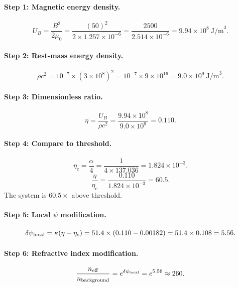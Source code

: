 \documentclass[12pt,a4paper]{article}
\theoremstyle{remark}
\begin{document}
\paragraph{Step 1: Magnetic energy density.}
\begin{equation}
U_B = \frac{B^2}{2\mu_0} = \frac{(50)^2}{2 \times 1.257 \times 10^{-6}}
= \frac{2500}{2.514 \times 10^{-6}} = 9.94 \times 10^{8}~\text{J/m}^3.
\end{equation}

\paragraph{Step 2: Rest-mass energy density.}
\begin{equation}
\rho c^2 = 10^{-7} \times (3 \times 10^8)^2 = 10^{-7} \times 9 \times 10^{16}
= 9.0 \times 10^{9}~\text{J/m}^3.
\end{equation}

\paragraph{Step 3: Dimensionless ratio.}
\begin{equation}
\eta = \frac{U_B}{\rho c^2} = \frac{9.94 \times 10^8}{9.0 \times 10^9} = 0.110.
\end{equation}

\paragraph{Step 4: Compare to threshold.}
\begin{equation}
\eta_c = \frac{\alpha}{4} = \frac{1}{4 \times 137.036} = 1.824 \times 10^{-3}.
\end{equation}
\begin{equation}
\frac{\eta}{\eta_c} = \frac{0.110}{1.824 \times 10^{-3}} = 60.5.
\end{equation}
The system is $60.5\times$ above threshold.

\paragraph{Step 5: Local $\psi$ modification.}
\begin{equation}
\delta\psi_{\rm local} = \kappa(\eta - \eta_c)
= 51.4 \times (0.110 - 0.00182) = 51.4 \times 0.108 = 5.56.
\end{equation}

\paragraph{Step 6: Refractive index modification.}
\begin{equation}
\frac{n_{\rm eff}}{n_{\rm background}} = e^{\delta\psi_{\rm local}}
= e^{5.56} \approx 260.
\end{equation}
\end{document}
